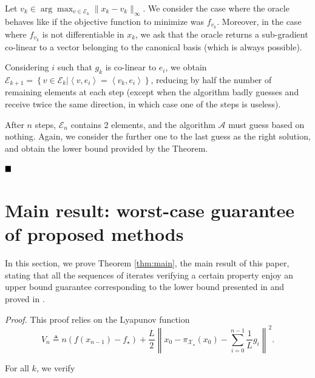     Let $v_k \in \arg\max_{v \in \mathcal{E}_k} \|x_k - v_k\|_\infty$.
    We consider the case where the oracle behaves like if the objective function to minimize was $f_{v_k}$. Moreover, in the case where $f_{v_k}$ is not differentiable in $x_k$, we ask that the oracle returns a sub-gradient co-linear to a vector belonging to the canonical basis (which is always possible).
    
    Considering $i$ such that $g_k$ is co-linear to $e_i$, we obtain
    $\mathcal{E}_{k+1} = \left\{ v \in \mathcal{E}_k | \left< v, e_i \right> = \left< v_k, e_i \right> \right\}$, reducing by half the number of remaining elements at each step (except when the algorithm badly guesses and receive twice the same direction, in which case one of the steps is useless).
    
    After $n$ steps, $\mathcal{E}_{n}$ contains 2 elements, and the algorithm $\mathcal{A}$ must guess based on nothing. Again, we consider the further one to the last guess as the right solution, and obtain the lower bound provided by the Theorem.
    
$\hfill\blacksquare$


\section{Main result: worst-case guarantee of proposed methods}
\label{apx:main_result}


In this section, we prove Theorem \ref{thm:main}, the main result of this paper, stating that all the sequences of iterates verifying a certain property enjoy an upper bound guarantee corresponding to the lower bound presented in  and proved in .

\mainresult*

\noindent \textit{Proof.}
    This proof relies on the Lyapunov function
    \begin{equation}
        V_n \triangleq n(f(x_{n-1}) - f_\star) + \frac{L}{2} \left\| x_0 - \pi_{\mathcal{X_\star}}(x_0) - \sum_{i=0}^{n-1}\frac{1}{L}g_i \right\|^2.
    \end{equation}
    
    For all $k$, we verify
    

